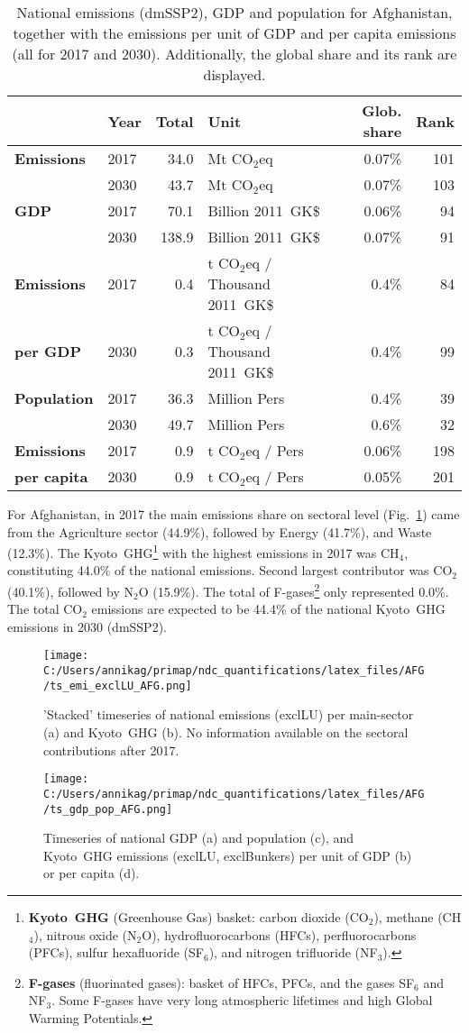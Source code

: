 \documentclass[12pt]{article}
\begin{document}
 \begin{table}[htbp]
 \centering
 \caption{National emissions (dmSSP2), GDP and population for Afghanistan, together with the emissions per unit of GDP and per capita emissions (all for 2017 and 2030). 
 Additionally, the global share and its rank are displayed.}
 \label{tab:overview}
 \begin{tabular}{l || l r l r r}
 \bfseries  & \bfseries Year & \bfseries Total & \bfseries Unit & \bfseries Glob. share & \bfseries Rank \tabularnewline \hline \hline
 \bfseries Emissions & 2017 & 34.0 & Mt CO$_2$eq & 0.07\% & 101 \tabularnewline 
 \bfseries  & 2030 & 43.7 & Mt CO$_2$eq & 0.07\% & 103 \tabularnewline \hline
 \bfseries GDP & 2017 & 70.1 & Billion 2011~GK\$ & 0.06\% & 94 \tabularnewline 
 \bfseries  & 2030 & 138.9 & Billion 2011~GK\$ & 0.07\% & 91 \tabularnewline \hline
 \bfseries Emissions & 2017 & 0.4 & t CO$_2$eq / Thousand 2011~GK\$ & 0.4\% & 84 \tabularnewline 
 \bfseries per GDP & 2030 & 0.3 & t CO$_2$eq / Thousand 2011~GK\$ & 0.4\% & 99 \tabularnewline \hline
 \bfseries Population & 2017 & 36.3 & Million Pers & 0.4\% & 39 \tabularnewline 
 \bfseries  & 2030 & 49.7 & Million Pers & 0.6\% & 32 \tabularnewline \hline
 \bfseries Emissions & 2017 & 0.9 & t CO$_2$eq /  Pers & 0.06\% & 198 \tabularnewline 
 \bfseries per capita & 2030 & 0.9 & t CO$_2$eq /  Pers & 0.05\% & 201 \tabularnewline 
 \end{tabular}
 \end{table}

 For Afghanistan, in 2017 the main emissions share on sectoral level (Fig.~\ref{fig:tsEmi}) came from the Agriculture sector (44.9\%), followed by Energy (41.7\%), and Waste (12.3\%). 
 The Kyoto~GHG\footnote{\textbf{Kyoto~GHG} (Greenhouse Gas) basket: carbon dioxide (CO$_2$), methane (CH$_4$), nitrous oxide (N$_2$O), hydrofluorocarbons (HFCs), perfluorocarbons (PFCs), sulfur hexafluoride (SF$_6$), and nitrogen trifluoride (NF$_3$).} with the highest emissions in 2017 was CH$_4$, constituting  44.0\% of the national emissions. 
 Second largest contributor was CO$_2$ (40.1\%), followed by N$_2$O (15.9\%). 
 The total of F-gases\footnote{\textbf{F-gases} (fluorinated gases): basket of HFCs, PFCs, and the gases SF$_6$ and NF$_3$. 
 Some F-gases have very long atmospheric lifetimes and high Global Warming Potentials.} only represented 0.0\%.
 The total CO$_2$ emissions are expected to be 44.4\% of the national Kyoto~GHG emissions in 2030 (dmSSP2).
 \begin{figure}[htbp]
 \centering
 \texttt{[image: C:/Users/annikag/primap/ndc\_quantifications/latex\_files/AFG/ts\_emi\_exclLU\_AFG.png]}
 \caption{'Stacked' timeseries of national emissions (exclLU) per main-sector (a) and Kyoto~GHG (b). 
 No information available on the sectoral contributions after 2017.}
 \label{fig:tsEmi}
 \end{figure}
 \begin{figure}[htbp]
 \centering
 \texttt{[image: C:/Users/annikag/primap/ndc\_quantifications/latex\_files/AFG/ts\_gdp\_pop\_AFG.png]}
 \caption{Timeseries of national GDP (a) and population (c), and Kyoto~GHG emissions (exclLU, exclBunkers) per unit of GDP (b) or per capita (d).}
 \label{fig:tsSocioEco}
 \end{figure}
\end{document}
